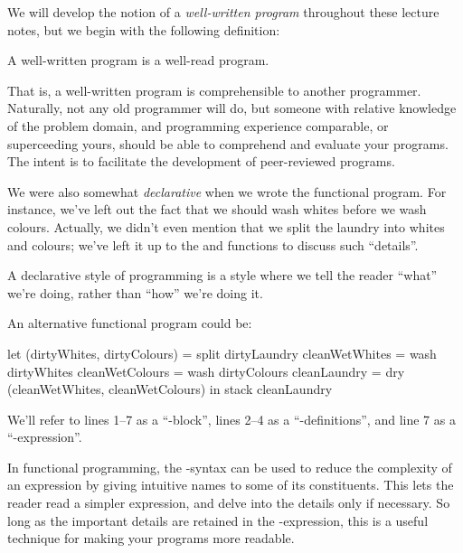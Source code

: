 We will develop the notion of a \emph{well-written program} throughout these
lecture notes, but we begin with the following definition:

\begin{definition}

A well-written program is a well-read program.

\end{definition}

That is, a well-written program is comprehensible to another programmer.
Naturally, not any old programmer will do, but someone with relative knowledge
of the problem domain, and programming experience comparable, or superceeding
yours, should be able to comprehend and evaluate your programs. The intent is
to facilitate the development of peer-reviewed programs.

We were also somewhat \emph{declarative} when we wrote the functional program.
For instance, we've left out the fact that we should wash whites before we wash
colours. Actually, we didn't even mention that we split the laundry into whites
and colours; we've left it up to the  and  functions to
discuss such ``details''.

\begin{definition}

A declarative style of programming is a style where we tell the reader ``what''
we're doing, rather than ``how'' we're doing it.

\end{definition}

An alternative functional program could be:

\begin{code}
let
  (dirtyWhites, dirtyColours) = split dirtyLaundry
  cleanWetWhites = wash dirtyWhites
  cleanWetColours = wash dirtyColours
  cleanLaundry = dry (cleanWetWhites, cleanWetColours)
in
  stack cleanLaundry
\end{code}

We'll refer to lines 1--7 as a ``-block'', lines 2--4 as a
``-definitions'', and line 7 as a ``-expression''.

In functional programming, the -syntax can be used to reduce the
complexity of an expression by giving intuitive names to some of its
constituents. This lets the reader read a simpler expression, and delve into
the details only if necessary. So long as the important details are retained in
the -expression, this is a useful technique for making your programs
more readable.

